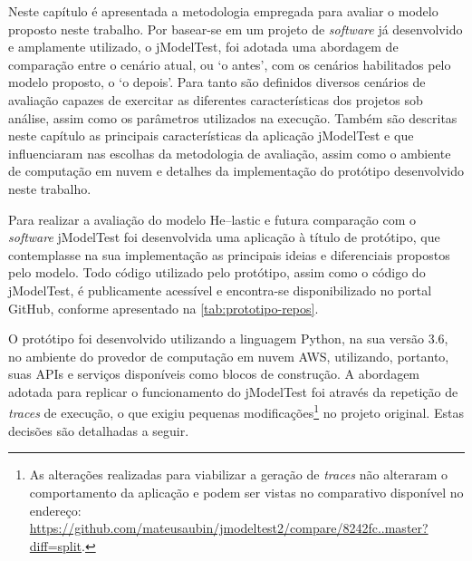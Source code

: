 \documentclass[english,brazilian]{UNISINOSmonografia} %
\begin{document}



Neste capítulo é apresentada a metodologia empregada para avaliar o modelo proposto neste trabalho.
%
Por basear-se em um projeto de \textit{software} já desenvolvido e amplamente utilizado, o jModelTest, foi adotada uma abordagem de comparação entre o cenário atual, ou \textquoteleft o antes\textquoteright, com os cenários habilitados pelo modelo proposto, o \textquoteleft o depois\textquoteright.
%
Para tanto são definidos diversos cenários de avaliação capazes de exercitar as diferentes características dos projetos sob análise, assim como os parâmetros utilizados na execução.
%
Também são descritas neste capítulo as principais características da aplicação jModelTest e que influenciaram nas escolhas da metodologia de avaliação, assim como o ambiente de computação em nuvem e detalhes da implementação do protótipo desenvolvido neste trabalho.



Para realizar a avaliação do modelo \textsf{He}--lastic e futura comparação com o \textit{software} jModelTest foi desenvolvida uma aplicação à título de protótipo, que contemplasse na sua implementação as principais ideias e diferenciais propostos pelo modelo.
Todo código utilizado pelo protótipo, assim como o código do jModelTest, é publicamente acessível e encontra-se disponibilizado no portal GitHub, conforme apresentado na \autoref{tab:prototipo-repos}.


O protótipo foi desenvolvido utilizando a linguagem Python, na sua versão 3.6, no ambiente do provedor de computação em nuvem AWS, utilizando, portanto, suas APIs e serviços disponíveis como blocos de construção.
A abordagem adotada para replicar o funcionamento do jModelTest foi através da repetição de \textit{traces} de execução, o que exigiu pequenas modificações\footnote{
	As alterações realizadas para viabilizar a geração de \textit{traces} não alteraram o comportamento da aplicação e podem ser vistas no comparativo disponível no endereço: \url{https://github.com/mateusaubin/jmodeltest2/compare/8242fc..master?diff=split}.
} no projeto original.
Estas decisões são detalhadas a seguir.
\end{document}
